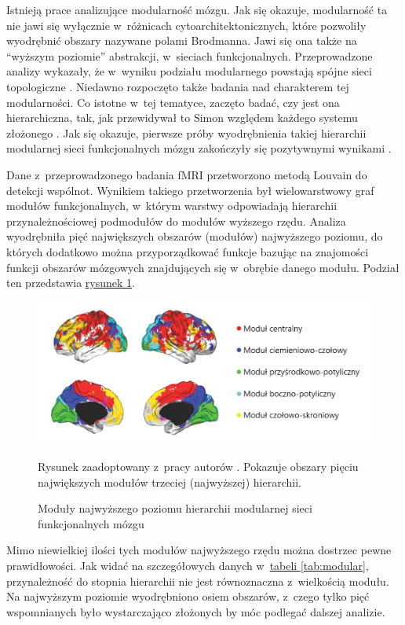 Istnieją prace analizujące modularność mózgu.
Jak się okazuje, modularność ta nie jawi się wyłącznie w~różnicach cytoarchitektonicznych, które pozwoliły wyodrębnić obszary nazywane polami Brodmanna.
Jawi się ona także na ``wyższym poziomie'' abstrakcji, w~sieciach funkcjonalnych.
Przeprowadzone analizy wykazały, że w~wyniku podziału modularnego powstają spójne sieci topologiczne \cite{bullmore2009complex}.
Niedawno rozpoczęto także badania nad charakterem tej modularności.
Co istotne w~tej tematyce, zaczęto badać, czy jest ona hierarchiczna, tak, jak przewidywał to Simon względem każdego systemu złożonego \cite{simon1962architecture}.
Jak się okazuje, pierwsze próby wyodrębnienia takiej hierarchii modularnej sieci funkcjonalnych mózgu zakończyły się pozytywnymi wynikami \cite{meunier2009hierarchical}.

Dane z~przeprowadzonego badania fMRI przetworzono metodą Louvain do detekcji wspólnot.
Wynikiem takiego przetworzenia był wielowarstwowy graf modułów funkcjonalnych, w~którym warstwy odpowiadają hierarchii przynależnościowej podmodułów do modułów wyższego rzędu.
Analiza wyodrębniła pięć największych obszarów (modułów) najwyższego poziomu, do których dodatkowo można przyporządkować funkcje bazując na znajomości funkcji obszarów mózgowych znajdujących się w~obrębie danego modułu.
Podział ten przedstawia \hyperref[fig:brain-functional-modules]{rysunek \ref*{fig:brain-functional-modules}}.

\begin{figure}[t]
	\includegraphics[width=\textwidth]{Images/BrainFunctionalModules}
	\caption{Moduły najwyższego poziomu hierarchii modularnej sieci funkcjonalnych mózgu}
	Rysunek zaadoptowany z~pracy autorów \cite{meunier2009hierarchical}.
	Pokazuje obszary pięciu największych modułów trzeciej (najwyższej) hierarchii.
	\label{fig:brain-functional-modules}
\end{figure}

Mimo niewielkiej ilości tych modułów najwyższego rzędu można dostrzec pewne prawidłowości.
Jak widać na szczegółowych danych w~\hyperref[tab:modular]{tabeli \ref*{tab:modular}}, przynależność do stopnia hierarchii nie jest równoznaczna z~wielkością modułu.
Na najwyższym poziomie wyodrębniono osiem obszarów, z~czego tylko pięć wspomnianych było wystarczająco złożonych by móc podlegać dalszej analizie.

